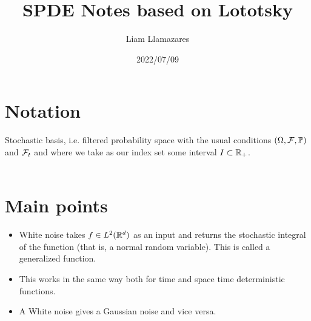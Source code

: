 \documentclass[12pt]{article}
\begin{document}
\begin{CJK*}{UTF8}{gbsn}
	\title{SPDE Notes based on Lototsky}
	\author{Liam Llamazares}
	\date{2022/07/09}
	\maketitle
	\section{Notation}
	Stochastic basis, i.e. filtered probability space with the usual conditions $(\Omega,\mathcal{F},\mathbb{P})$ and $\mathcal{F}_t$ and where we take as our index set some interval $I\subset {\mathbb R}_+$.\\
	\\
	\section{Main points}
	\begin{itemize}
		\item White noise takes $f\in L^2({\mathbb R}^d)$ as an input  and returns  the stochastic integral of the function (that is, a normal random variable). This is called a generalized function.
		\item This works in the same way both for time and space time deterministic functions.
		\item A White noise gives a Gaussian noise and vice versa.
	\end{itemize}

\end{CJK*}
\end{document}
